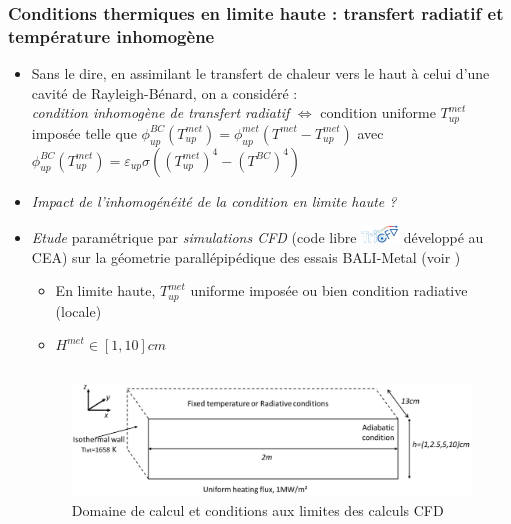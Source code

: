 \subsubsection{Conditions thermiques en limite haute : transfert radiatif et température inhomogène}
\begin{frame}[fragile]
	\begin{itemize}
	\item Sans le dire, en assimilant le transfert de chaleur vers le haut à celui d'une cavité de Rayleigh-Bénard, on a considéré : \\
	\emph{condition inhomogène de transfert radiatif} $\Leftrightarrow$ condition uniforme $T_{up}^{met}$ imposée telle que $\phi_{up}^{BC}\left(T_{up}^{met}\right) = \phi_{up}^{met}\left(T^{met}-T_{up}^{met}\right)$ avec $\phi^{BC}_{up}\left(T^{met}_{up}\right)=\varepsilon_{up}\sigma\left(\left(T^{met}_{up}\right)^4-\left(T^{BC}\right)^4\right)$
	\item \emph{Impact de l'inhomogénéité de la condition en limite haute ?}
	\item \emph{Etude} paramétrique par \emph{simulations CFD} (code libre \includegraphics[width=1cm]{Figures/Logo_TrioCFD.eps} développé au CEA) sur la géometrie parallépipédique des essais BALI-Metal (voir \cite{Peybernes2020})
	\begin{itemize}
	\item En limite haute, $T_{up}^{met}$ uniforme imposée ou bien condition radiative (locale)
	\item $H^{met} \in [1, 10]cm$
	\end{itemize}
	\begin{columns}[T]
		\begin{column}{0.7\textwidth}
	\begin{figure}[H]
	\centering \includegraphics[width=\textwidth]{Figures/Fig3_Peybernes2020.png} \\
	{\tiny Domaine de calcul et conditions aux limites des calculs CFD}

\end{figure}
\end{column}
\end{columns}
\end{itemize}
\end{frame}
